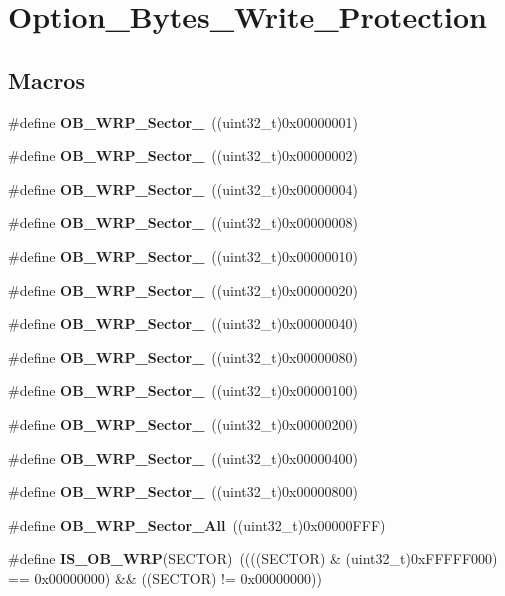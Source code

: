 \section{Option\+\_\+\+Bytes\+\_\+\+Write\+\_\+\+Protection}
\label{group__Option__Bytes__Write__Protection}
\subsection*{Macros}
\begin{DoxyCompactItemize}
\item 
\#define \textbf{ O\+B\+\_\+\+W\+R\+P\+\_\+\+Sector\+\_}~((uint32\+\_\+t)0x00000001)
\item 
\#define \textbf{ O\+B\+\_\+\+W\+R\+P\+\_\+\+Sector\+\_}~((uint32\+\_\+t)0x00000002)
\item 
\#define \textbf{ O\+B\+\_\+\+W\+R\+P\+\_\+\+Sector\+\_}~((uint32\+\_\+t)0x00000004)
\item 
\#define \textbf{ O\+B\+\_\+\+W\+R\+P\+\_\+\+Sector\+\_}~((uint32\+\_\+t)0x00000008)
\item 
\#define \textbf{ O\+B\+\_\+\+W\+R\+P\+\_\+\+Sector\+\_}~((uint32\+\_\+t)0x00000010)
\item 
\#define \textbf{ O\+B\+\_\+\+W\+R\+P\+\_\+\+Sector\+\_}~((uint32\+\_\+t)0x00000020)
\item 
\#define \textbf{ O\+B\+\_\+\+W\+R\+P\+\_\+\+Sector\+\_}~((uint32\+\_\+t)0x00000040)
\item 
\#define \textbf{ O\+B\+\_\+\+W\+R\+P\+\_\+\+Sector\+\_}~((uint32\+\_\+t)0x00000080)
\item 
\#define \textbf{ O\+B\+\_\+\+W\+R\+P\+\_\+\+Sector\+\_}~((uint32\+\_\+t)0x00000100)
\item 
\#define \textbf{ O\+B\+\_\+\+W\+R\+P\+\_\+\+Sector\+\_}~((uint32\+\_\+t)0x00000200)
\item 
\#define \textbf{ O\+B\+\_\+\+W\+R\+P\+\_\+\+Sector\+\_}~((uint32\+\_\+t)0x00000400)
\item 
\#define \textbf{ O\+B\+\_\+\+W\+R\+P\+\_\+\+Sector\+\_}~((uint32\+\_\+t)0x00000800)
\item 
\#define \textbf{ O\+B\+\_\+\+W\+R\+P\+\_\+\+Sector\+\_\+\+All}~((uint32\+\_\+t)0x00000\+F\+F\+F)
\item 
\#define \textbf{ I\+S\+\_\+\+O\+B\+\_\+\+W\+RP}(S\+E\+C\+T\+OR)~((((S\+E\+C\+T\+OR) \& (uint32\+\_\+t)0x\+F\+F\+F\+F\+F000) == 0x00000000) \&\& ((\+S\+E\+C\+T\+O\+R) != 0x00000000))
\end{DoxyCompactItemize}


